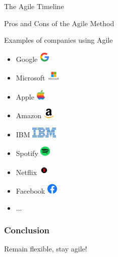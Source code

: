 \documentclass[10pt]{beamer}
\begin{document}
\begin{frame}{The Agile Timeline}
\end{frame}

\begin{frame}{Pros and Cons of the Agile Method}
\end{frame}

\begin{frame}{Examples of companies using Agile}
    \begin{itemize}
        \item<2-> Google \hfill \includegraphics[height=0.5cm]{images/Google_logo.png}
        \item<3-> Microsoft \hfill \includegraphics[height=0.5cm]{images/Microsoft_logo.jpg}
        \item<4-> Apple \hfill \includegraphics[height=0.5cm]{images/Apple_logo.png}
        \item<5-> Amazon \hfill \includegraphics[height=0.5cm]{images/Amazon_logo.png}
        \item<6-> IBM \hfill \includegraphics[height=0.5cm]{images/IBM_logo.png}
        \item<7-> Spotify \hfill \includegraphics[height=0.5cm]{images/Spotify_logo.png}
        \item<8-> Netflix \hfill \includegraphics[height=0.5cm]{images/Netflix_logo.jpg}
        \item<9-> Facebook \hfill \includegraphics[height=0.5cm]{images/Facebook_logo.png}
        \item<10-> ...
    \end{itemize}
\end{frame}
\begin{frame}[plain]
  \frametitle{Conclusion}
  \begin{center}
      \Huge Remain flexible, stay agile!
  \end{center}
\end{frame}
\end{document}
